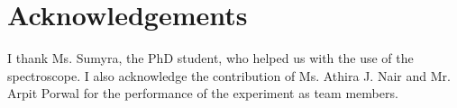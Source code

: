 \section{Acknowledgements}
I thank Ms. Sumyra, the PhD student, who helped us with the use of the spectroscope. I also acknowledge the contribution of Ms. Athira J. Nair and Mr. Arpit Porwal for the performance of the experiment as team members.